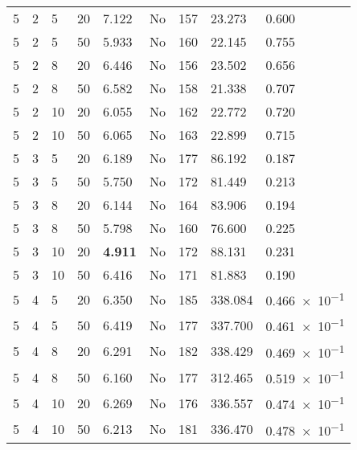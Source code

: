\begin{longtable}{x{1.5cm} x{1.8cm} x{1.8cm} x{1.5cm} x{1.8cm} x{1.5cm} x{1.5cm} x{1.5cm} x{1.8cm}}
	5 & 2 & 5 & 20 & 7.122 & No & 157 & 23.273 & 0.600 \\
	5 & 2 & 5 & 50 & 5.933 & No & 160 & 22.145 & 0.755 \\
	5 & 2 & 8 & 20 & 6.446 & No & 156 & 23.502 & 0.656 \\
	5 & 2 & 8 & 50 & 6.582 & No & 158 & 21.338 & 0.707 \\
	5 & 2 & 10 & 20 & 6.055 & No & 162 & 22.772 & 0.720 \\
	5 & 2 & 10 & 50 & 6.065 & No & 163 & 22.899 & 0.715 \\
	5 & 3 & 5 & 20 & 6.189 & No & 177 & 86.192 & 0.187 \\
	5 & 3 & 5 & 50 & 5.750 & No & 172 & 81.449 & 0.213 \\
	5 & 3 & 8 & 20 & 6.144 & No & 164 & 83.906 & 0.194 \\
	5 & 3 & 8 & 50 & 5.798 & No & 160 & 76.600 & 0.225 \\
	5 & 3 & 10 & 20 & \textbf{4.911} & No & 172 & 88.131 & 0.231 \\
	5 & 3 & 10 & 50 & 6.416 & No & 171 & 81.883 & 0.190 \\
	5 & 4 & 5 & 20 & 6.350 & No & 185 & 338.084 & \num{0.466e-1} \\
	5 & 4 & 5 & 50 & 6.419 & No & 177 & 337.700 & \num{0.461e-1} \\
	5 & 4 & 8 & 20 & 6.291 & No & 182 & 338.429 & \num{0.469e-1} \\
	5 & 4 & 8 & 50 & 6.160 & No & 177 & 312.465 & \num{0.519e-1} \\
	5 & 4 & 10 & 20 & 6.269 & No & 176 & 336.557 & \num{0.474e-1} \\
	5 & 4 & 10 & 50 & 6.213 & No & 181 & 336.470 & \num{0.478e-1}\label{tab:calibration198} \\
\end{longtable}
\setlength{\arrayrulewidth}{1pt}
\renewcommand{\arraystretch}{1}